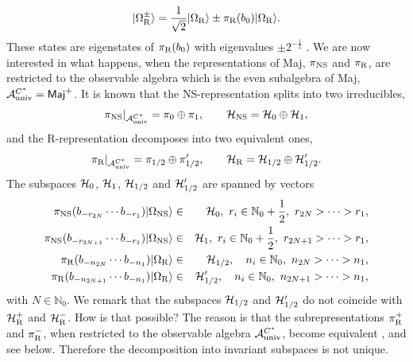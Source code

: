 \documentclass[10pt,a4paper]{article}
\begin{document}
\[ |\Omega_{\rm R}^\pm\rangle = \frac{1}{\sqrt{2}}
|\Omega_{\rm R}\rangle \pm \pi_{\rm R}(b_0)|\Omega_{\rm R}\rangle. \]
These states are eigenstates of $\pi_{\rm R}(b_0)$
with eigenvalues $\pm 2^{-\frac{1}{2}}$
\cite{Szl1}. We are now interested in what
happens, when the representations of {\sf Maj},
$\pi_{\rm NS}$ and $\pi_{\rm R}$, are restricted to the
observable algebra which is the even subalgebra
of {\sf Maj},
${\cal A}_{\rm univ}^{C^*}=\mbox{\sf Maj}^+$.
It is known that the NS-representation splits into
two irreducibles,
\begin{equation}
\pi_{\rm NS}|_{{\cal A}_{\rm univ}^{C^*}} =
\pi_0 \oplus \pi_1,\qquad
{\cal H}_{\rm NS}={\cal H}_0 \oplus {\cal H}_1,
\end{equation}
and the R-representation decomposes into two
equivalent ones,
\begin{equation}
\pi_{\rm R}|_{{\cal A}_{\rm univ}^{C^*}} =
\pi_{1/2} \oplus \pi_{1/2}',\qquad {\cal H}_{\rm R} =
{\cal H}_{1/2} \oplus {\cal H}_{1/2}'.
\end{equation}
The subspaces ${\cal H}_0$, ${\cal H}_1$,
${\cal H}_{1/2}$ and ${\cal H}_{1/2}'$
are spanned by vectors
\begin{eqnarray*}
\pi_{\rm NS}(b_{-r_{2N}} \cdots b_{-r_1}) |\Omega_{\rm NS}\rangle &\in&
{\cal H}_0,\,\, r_i\in \mathbb{N}_0+\frac{1}{2},\,\, r_{2N}>
\cdots >r_1,\\
\pi_{\rm NS}(b_{-r_{2N+1}} \cdots b_{-r_1}) |\Omega_{\rm NS}\rangle &\in&
{\cal H}_1,\,\,r_i\in \mathbb{N}_0+\frac{1}{2},\,\, r_{2N+1}>
\cdots >r_1,\\
\pi_{\rm R}(b_{-n_{2N}} \cdots b_{-n_1}) |\Omega_{\rm R}\rangle &\in&
{\cal H}_{1/2}, \quad n_i\in \mathbb{N}_0,\,\, n_{2N}>
\cdots >n_1,\\
\pi_{\rm R}(b_{-n_{2N+1}} \cdots b_{-n_1}) |\Omega_{\rm R}\rangle &\in&
{\cal H}_{1/2}', \quad n_i\in \mathbb{N}_0,\,\, n_{2N+1}>
\cdots >n_1,
\end{eqnarray*}
with $N\in \mathbb{N}_0$. We remark that the subspaces
${\cal H}_{1/2}$ and ${\cal H}_{1/2}'$
do not coincide with ${\cal H}_{\rm R}^+$ and ${\cal H}_{\rm R}^-$.
How is that possible? The reason is that the
subrepresentations $\pi_{\rm R}^+$ and $\pi_{\rm R}^-$, when
restricted to the observable algebra
${\cal A}_{\rm univ}^{C^*}$, become equivalent
\cite{Szl1}, and see below.  Therefore the
decomposition into invariant subspaces is not
unique.
\end{document}
